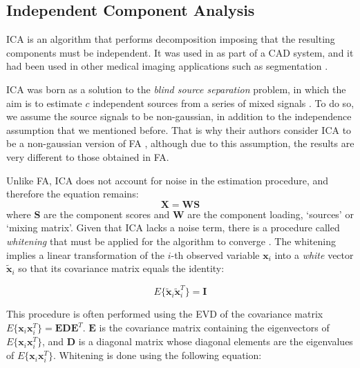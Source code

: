 \subsection{Independent Component Analysis}
\acf{ICA} \cite{Hyvarinen2000} is an algorithm that performs decomposition imposing that the resulting components must be independent. It was used in \cite{Alvarez2009,Martinez201141,Martinez-Murcia20129676} as part of a \ac{CAD} system, and it had been used in other medical imaging applications such as segmentation \cite{DeMartino2007}. 

\ac{ICA} was born as a solution to the \textit{blind source separation} problem, in which the aim is to estimate $c$ independent sources from a series of mixed signals \cite{Hyvarinen2000}. To do so, we assume the source signals to be non-gaussian, in addition to the independence assumption that we mentioned before. That is why their authors consider \ac{ICA} to be a non-gaussian version of \ac{FA} \cite{Hyvaerinen2003}, although due to this assumption, the results are very different to those obtained in \ac{FA}. 

Unlike \ac{FA}, \ac{ICA} does not account for noise in the estimation procedure, and therefore the equation remains: 
\begin{equation}\label{eq:icaecuation}
\mathbf{X} = \mathbf{W}\mathbf{S}
\end{equation}
where $\mathbf{S}$ are the component scores and $\mathbf{W}$ are the component loading, `sources' or `mixing matrix'. Given that \ac{ICA} lacks a noise term, there is a procedure called \textit{whitening} that must be applied for the algorithm to converge \cite{Hyvarinen2000}. The whitening implies a linear transformation of the $i$-th observed variable $\mathbf{x}_i$ into a \textit{white} vector $\tilde{\mathbf{x}}_i$ so that its covariance matrix equals the identity: 

\begin{equation}
E\{\tilde{\mathbf{x}}_i \tilde{\mathbf{x}}_i^T\}=\mathbf{I}
\end{equation}

This procedure is often performed using the \acf{EVD} of the covariance matrix $E\{\mathbf{x}_i \mathbf{x}_i^T\} = \mathbf{E}\mathbf{D}\mathbf{E}^T$. $\mathbf{E}$ is the covariance matrix containing the eigenvectors of $E\{\mathbf{x}_i \mathbf{x}_i^T\}$, and $\mathbf{D}$ is a diagonal matrix whose diagonal elements are the eigenvalues of $E\{\mathbf{x}_i \mathbf{x}_i^T\}$. Whitening is done using the following equation: 

